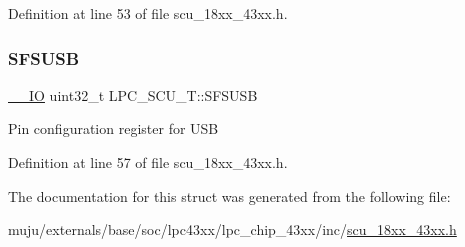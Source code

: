 Definition at line 53 of file scu\+\_\+18xx\+\_\+43xx.\+h.

\mbox{\label{struct_l_p_c___s_c_u___t_a7f46caa9ce7787b67dcd9163623091fc}} 
\subsubsection{\texorpdfstring{S\+F\+S\+U\+SB}{SFSUSB}}
{\footnotesize\ttfamily \hyperlink{core__sc300_8h_aec43007d9998a0a0e01faede4133d6be}{\+\_\+\+\_\+\+IO} uint32\+\_\+t L\+P\+C\+\_\+\+S\+C\+U\+\_\+\+T\+::\+S\+F\+S\+U\+SB}

Pin configuration register for U\+SB 

Definition at line 57 of file scu\+\_\+18xx\+\_\+43xx.\+h.



The documentation for this struct was generated from the following file\+:\begin{DoxyCompactItemize}
\item 
muju/externals/base/soc/lpc43xx/lpc\+\_\+chip\+\_\+43xx/inc/\hyperlink{scu__18xx__43xx_8h}{scu\+\_\+18xx\+\_\+43xx.\+h}\end{DoxyCompactItemize}
